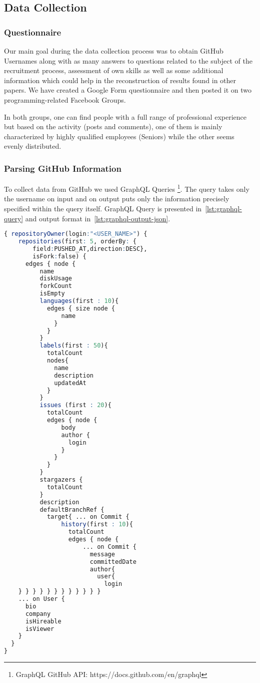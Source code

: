 \subsection{Data Collection}

\subsubsection{Questionnaire}

Our main goal during the data collection process was to obtain GitHub Usernames along with as many answers to questions related to the subject of the recruitment process, assessment of own skills as well as some additional information which could help in the reconstruction of results found in other papers. We have created a Google Form questionnaire and then posted it on two programming-related Facebook Groups.

In both groups, one can find people with a full range of professional experience but based on the activity (posts and comments), one of them is mainly characterized by highly qualified employees (Seniors) while the other seems evenly distributed.

\subsubsection{Parsing GitHub Information}

To collect data from GitHub we used GraphQL Queries \footnote{GraphQL GitHub API: https://docs.github.com/en/graphql}. The query takes only the username on input and on output puts only the information precisely specified within the query itself. GraphQL Query is presented in~\ref{lst:graphql-query} and output format in~\ref{lst:graphql-output-json}.


\begin{lstlisting}[language=R, label={lst:graphql-query}]
{ repositoryOwner(login:"<USER_NAME>") {
    repositories(first: 5, orderBy: {
        field:PUSHED_AT,direction:DESC},
        isFork:false) {
      edges { node {
          name
          diskUsage
          forkCount
          isEmpty
          languages(first : 10){
            edges { size node {
                name
              }
            }
          }
          labels(first : 50){
            totalCount
            nodes{
              name
              description
              updatedAt
            }
          }
          issues (first : 20){
            totalCount
            edges { node {
                body
                author {
                  login
                }
              }
            }
          }
          stargazers {
            totalCount
          }
          description
          defaultBranchRef {
            target{ ... on Commit {
                history(first : 10){
                  totalCount
                  edges { node {
                      ... on Commit {
                        message
                        committedDate
                        author{
                          user{
                            login
    } } } } } } } } } } } }
    ... on User {
      bio
      company
      isHireable
      isViewer
    }
  }
}
\end{lstlisting}

